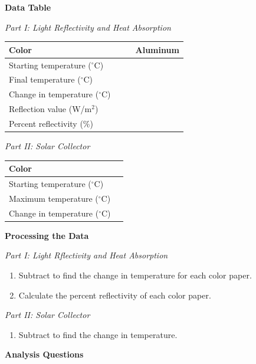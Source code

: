 \documentclass[english,twoside]{article}
\begin{document}
\textbf{Data Table}

\textit{Part I: Light Reflectivity and Heat Absorption}

\begin{center}
\begin{tabular}{ | M{4.0cm} | M{2.5cm} | M{2.5cm} | M{2.5cm} |}
 \hline
Color & & & Aluminum \\ \hline
Starting temperature ($^\circ$C) & & & \\[15pt] \hline
Final temperature ($^\circ$C) & & & \\[15pt] \hline
Change in temperature ($^\circ$C) & & & \\[15pt] \hline
Reflection value (W/m$^{2}$) & & & \\[15pt] \hline
Percent reflectivity (\%) & & & \\[15pt] \hline
\end{tabular}
\end{center}

\textit{Part II: Solar Collector}

\begin{center}
\begin{tabular}{ | M{4.0cm} | M{2.5cm} | }
 \hline
Color &  \\ \hline
Starting temperature ($^\circ$C) &  \\[15pt] \hline
Maximum temperature ($^\circ$C) &  \\[15pt] \hline
Change in temperature ($^\circ$C) & \\[15pt] \hline
\end{tabular}
\end{center}

\textbf{Processing the Data}

\textit{Part I: Light Rflectivity and Heat Absorption}
\begin{enumerate}
	\item Subtract to find the change in temperature for each color paper. 
	\item Calculate the percent reflectivity of each color paper.
\end{enumerate}

\textit{Part II: Solar Collector}
\begin{enumerate} 
	\item Subtract to find the change in temperature. 
\end{enumerate}

\textbf{Analysis Questions}
\end{document}
